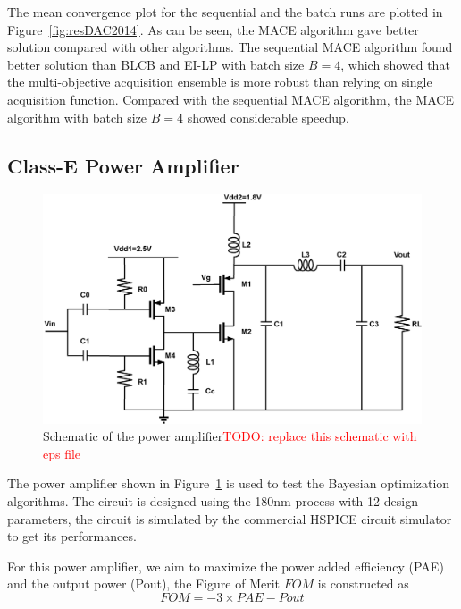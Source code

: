 The mean convergence plot for the sequential and the batch runs are plotted in
Figure~\ref{fig:resDAC2014}. As can be seen, the MACE algorithm gave better
solution compared with other algorithms. The sequential MACE algorithm found
better solution than BLCB and EI-LP with batch size $B = 4$, which showed that
the multi-objective acquisition ensemble is more robust than relying on single
acquisition function. Compared with the sequential MACE algorithm, the MACE
algorithm with batch size $B = 4$ showed considerable speedup.


\subsection{Class-E Power Amplifier}


\begin{figure}[htbp]
    \begin{center}
        \centerline{\includegraphics[width=\columnwidth]{./img/classE.eps}}
        \caption{Schematic of the power amplifier\textcolor{red}{TODO: replace this schematic with eps file} }
        \label{fig:schPA}
    \end{center}
\end{figure}

The power amplifier shown in Figure~\ref{fig:schPA} is used to test the Bayesian optimization algorithms. The
circuit is designed using the 180nm process with 12 design parameters, the
circuit is simulated by the commercial HSPICE circuit simulator to get its performances.

For this power amplifier, we aim to maximize the power added efficiency (PAE) and the output power (Pout), the Figure of Merit $FOM$ is constructed as
$$
\mathit{FOM} = -3 \times \mathit{PAE} - \mathit{Pout}
$$

